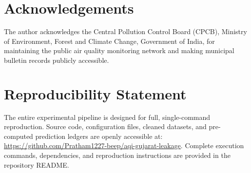 \section*{Acknowledgements}
The author acknowledges the Central Pollution Control Board (CPCB), Ministry of Environment, Forest and Climate Change, Government of India, for maintaining the public air quality monitoring network and making municipal bulletin records publicly accessible.

\section*{Reproducibility Statement}
The entire experimental pipeline is designed for full, single-command reproduction. Source code, configuration files, cleaned datasets, and pre-computed prediction ledgers are openly accessible at: \url{https://github.com/Pratham1227-beep/aqi-gujarat-leakage}. Complete execution commands, dependencies, and reproduction instructions are provided in the repository README.

